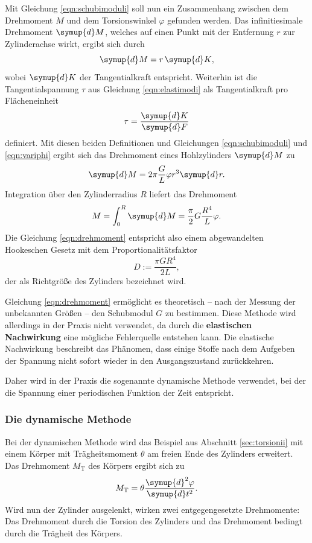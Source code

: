 Mit Gleichung \eqref{eqn:schubimoduli} soll nun ein Zusammenhang zwischen dem Drehmoment $M$
und dem Torsionswinkel $\varphi$ gefunden werden.
Das infinitiesimale Drehmoment $\symup{d} M$, welches auf einen Punkt mit der Entfernung $r$
zur Zylinderachse wirkt, ergibt sich durch
\begin{equation*}
	\symup{d} M = r \, \symup{d}K \mathrm{,}
\end{equation*}
wobei $\symup{d} K$ der Tangentialkraft entspricht.
Weiterhin ist die Tangentialspannung $\tau$ aus Gleichung \eqref{eqn:elastimodi} als
Tangentialkraft pro Flächeneinheit
\begin{equation*}
	\tau = \frac{\symup{d} K}{\symup{d} F}
\end{equation*}
definiert.
Mit diesen beiden Definitionen und Gleichungen \eqref{eqn:schubimoduli} und \eqref{eqn:variphi}
ergibt sich das Drehmoment eines Hohlzylinders $\symup{d} M$ zu
\begin{equation}
	\symup{d} M = 2\pi \frac{G}{L} \varphi r^3 \symup{d}r \mathrm{.}
\end{equation}
Integration über den Zylinderradius $R$ liefert das Drehmoment
\begin{equation}
	\label{eqn:drehmoment}
	M = \int_0^R \symup{d} M = \frac{\pi}{2} G \frac{R^4}{L} \varphi \mathrm{.}
\end{equation}
Die Gleichung \eqref{eqn:drehmoment} entspricht also einem abgewandelten Hookeschen Gesetz
mit dem Proportionalitätsfaktor
\begin{equation}
	\label{eqn:richti}
	D := \frac{\pi G R^4}{2L} \mathrm{,}
\end{equation}
der als Richtgröße des Zylinders bezeichnet wird.

Gleichung \eqref{eqn:drehmoment} ermöglicht es theoretisch -- nach der Messung der unbekannten
Größen -- den Schubmodul $G$ zu bestimmen.
Diese Methode wird allerdings in der Praxis nicht verwendet, da durch die \textbf{elastischen
Nachwirkung} eine mögliche Fehlerquelle entstehen kann.
Die elastische Nachwirkung beschreibt das Phänomen, dass einige Stoffe nach dem Aufgeben der
Spannung nicht sofort wieder in den Ausgangszustand zurückkehren.

Daher wird in der Praxis die sogenannte dynamische Methode verwendet, bei der die Spannung
einer periodischen Funktion der Zeit entspricht.

\subsubsection{Die dynamische Methode}
\label{sec:dynamisch}
Bei der dynamischen Methode wird das Beispiel aus Abschnitt \ref{sec:torsionii} mit einem Körper
mit Trägheitsmoment $\theta$ am freien Ende des Zylinders erweitert.
Das Drehmoment $M_{\mathrm{T}}$  des Körpers ergibt sich zu
\begin{equation}
	M_{\mathrm{T}} = \theta \frac{\symup{d}^2 \varphi}{\symup{d} t^2} \mathrm{.}
\end{equation}
Wird nun der Zylinder ausgelenkt, wirken zwei entgegengesetzte Drehmomente: Das Drehmoment
durch die Torsion des Zylinders und das Drehmoment bedingt durch die Trägheit des Körpers.

